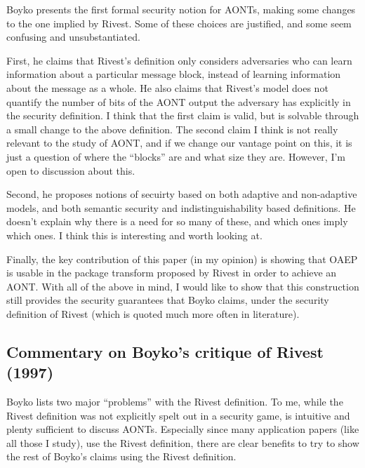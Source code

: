 \documentclass[11pt,twoside]{article}
\begin{document}
Boyko presents the first formal security notion for AONTs, making some changes to the one implied by Rivest. Some of these choices are justified, and some seem confusing and unsubstantiated. 

First, he claims that Rivest's definition only considers adversaries who can learn information about a particular message block, instead of learning information about the message as a whole. He also claims that Rivest's model does not quantify the number of bits of the AONT output the adversary has explicitly in the security definition. I think that the first claim is valid, but is solvable through a small change to the above definition. The second claim I think is not really relevant to the study of AONT, and if we change our vantage point on this, it is just a question of where the ``blocks'' are and what size they are. However, I'm open to discussion about this. 

Second, he proposes notions of secuirty based on both adaptive and non-adaptive models, and both semantic security and indistinguishability based definitions. He doesn't explain why there is a need for so many of these, and which ones imply which ones. I think this is interesting and worth looking at. 

Finally, the key contribution of this paper (in my opinion) is showing that OAEP is usable in the package transform proposed by Rivest in order to achieve an AONT. With all of the above in mind, I would like to show that this construction still provides the security guarantees that Boyko claims, under the security definition of Rivest (which is quoted much more often in literature). 

\subsection{Commentary on Boyko's critique of Rivest (1997)}

Boyko lists two major ``problems'' with the Rivest definition. To me, while the Rivest definition was not explicitly spelt out in a security game, is intuitive and plenty sufficient to discuss AONTs. Especially since many application papers (like all those I study), use the Rivest definition, there are clear benefits to try to show the rest of Boyko's claims using the Rivest definition. 
\end{document}
